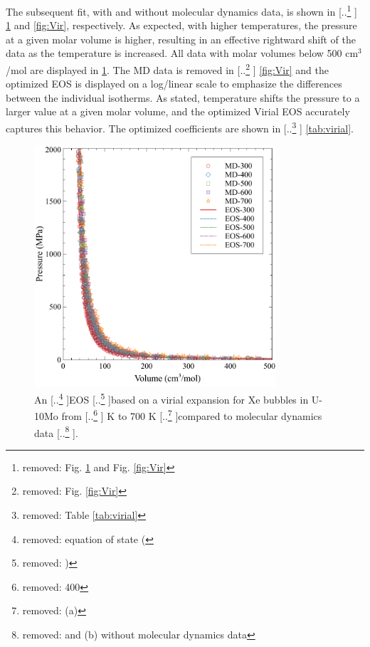 \documentclass[review]{elsarticle}
\providecommand{\DIFaddtex}[1]{{\protect\color{blue} \sf #1}} %
\providecommand{\DIFdeltex}[1]{{\protect\color{red} [..\footnote{removed: #1} ]}} %
\providecommand{\DIFaddbegin}{} %
\providecommand{\DIFaddend}{} %
\providecommand{\DIFdelbegin}{} %
\providecommand{\DIFdelend}{} %
\providecommand{\DIFaddFL}[1]{\DIFadd{#1}} %
\providecommand{\DIFdelFL}[1]{\DIFdel{#1}} %
\providecommand{\DIFaddbeginFL}{} %
\providecommand{\DIFaddendFL}{} %
\providecommand{\DIFdelbeginFL}{} %
\providecommand{\DIFdelendFL}{} %
\providecommand{\DIFadd}[1]{\texorpdfstring{\DIFaddtex{#1}}{#1}} %
\providecommand{\DIFdel}[1]{\texorpdfstring{\DIFdeltex{#1}}{}} %
\newcommand{\DIFscaledelfig}{0.5}
\newlength{\DIFdelgraphicswidth} %
\newlength{\DIFdelgraphicsheight} %
\newcommand{\DIFaddincludegraphics}[2][]{{\color{blue}\fbox{\DIFOincludegraphics[#1]{#2}}}} %
\newcommand{\DIFdelincludegraphics}[2][]{%
\sbox{\DIFdelgraphicsbox}{\DIFOincludegraphics[#1]{#2}}%
\settoboxwidth{\DIFdelgraphicswidth}{\DIFdelgraphicsbox} %
\settoboxtotalheight{\DIFdelgraphicsheight}{\DIFdelgraphicsbox} %
\scalebox{\DIFscaledelfig}{%
\parbox[b]{\DIFdelgraphicswidth}{\usebox{\DIFdelgraphicsbox}\\[-\baselineskip] \rule{\DIFdelgraphicswidth}{0em}}\llap{\resizebox{\DIFdelgraphicswidth}{\DIFdelgraphicsheight}{%
\setlength{\unitlength}{\DIFdelgraphicswidth}%
\begin{picture}(1,1)%
\thicklines\linethickness{2pt} %
{\color[rgb]{1,0,0}\put(0,0){\framebox(1,1){}}}%
{\color[rgb]{1,0,0}\put(0,0){\line( 1,1){1}}}%
{\color[rgb]{1,0,0}\put(0,1){\line(1,-1){1}}}%
\end{picture}%
}\hspace*{3pt}}} %
} %
\DeclareRobustCommand{\DIFaddbegin}{\DIFOaddbegin \let\includegraphics\DIFaddincludegraphics} %
\DeclareRobustCommand{\DIFaddend}{\DIFOaddend \let\includegraphics\DIFOincludegraphics} %
\DeclareRobustCommand{\DIFdelbegin}{\DIFOdelbegin \let\includegraphics\DIFdelincludegraphics} %
\DeclareRobustCommand{\DIFdelend}{\DIFOaddend \let\includegraphics\DIFOincludegraphics} %
\DeclareRobustCommand{\DIFaddbeginFL}{\DIFOaddbeginFL \let\includegraphics\DIFaddincludegraphics} %
\DeclareRobustCommand{\DIFaddendFL}{\DIFOaddendFL \let\includegraphics\DIFOincludegraphics} %
\DeclareRobustCommand{\DIFdelbeginFL}{\DIFOdelbeginFL \let\includegraphics\DIFdelincludegraphics} %
\DeclareRobustCommand{\DIFdelendFL}{\DIFOaddendFL \let\includegraphics\DIFOincludegraphics} %
\begin{document}
The subsequent fit, with and without molecular dynamics data, is shown in \DIFdelbegin \DIFdel{Fig. \ref{fig:MD_Vir} and Fig. \ref{fig:Vir}}\DIFdelend \DIFaddbegin \DIFadd{\cref{fig:MD_Vir} and \cref{fig:Vir}}\DIFaddend , respectively. \DIFaddbegin \DIFadd{As expected, with higher temperatures, the pressure at a given molar volume is higher, resulting in an effective rightward shift of the data as the temperature is increased. All data with molar volumes below 500 cm$^3$/mol are displayed in \cref{fig:MD_Vir}. }\DIFaddend The MD data is removed in \DIFdelbegin \DIFdel{Fig. \ref{fig:Vir} }\DIFdelend \DIFaddbegin \DIFadd{\cref{fig:Vir} }\DIFaddend and the optimized EOS is displayed on a log/linear scale to emphasize the differences between the individual isotherms. \DIFaddbegin \DIFadd{As stated, temperature shifts the pressure to a larger value at a given molar volume, and the optimized Virial EOS accurately captures this behavior. }\DIFaddend The optimized coefficients are shown in \DIFdelbegin \DIFdel{Table \ref{tab:virial}}\DIFdelend \DIFaddbegin \DIFadd{\cref{tab:virial}}\DIFaddend . 

\begin{figure}[h!]
 \centering
 \DIFdelbeginFL %
\DIFdelendFL \DIFaddbeginFL \includegraphics[width=0.8\textwidth]{MD_Virial} 
 \DIFaddendFL \caption{An \DIFdelbeginFL \DIFdelFL{equation of state (}\DIFdelendFL EOS \DIFdelbeginFL \DIFdelFL{) }\DIFdelendFL based on a virial expansion for Xe bubbles in U-10Mo from \DIFdelbeginFL \DIFdelFL{400 }\DIFdelendFL \DIFaddbeginFL \DIFaddFL{300 }\DIFaddendFL K to 700 K \DIFdelbeginFL \DIFdelFL{(a) }\DIFdelendFL compared to molecular dynamics data\DIFdelbeginFL \DIFdelFL{and (b) without molecular dynamics data}\DIFdelendFL . }
 \label{fig:MD_Vir}
\end{figure}
\end{document}
